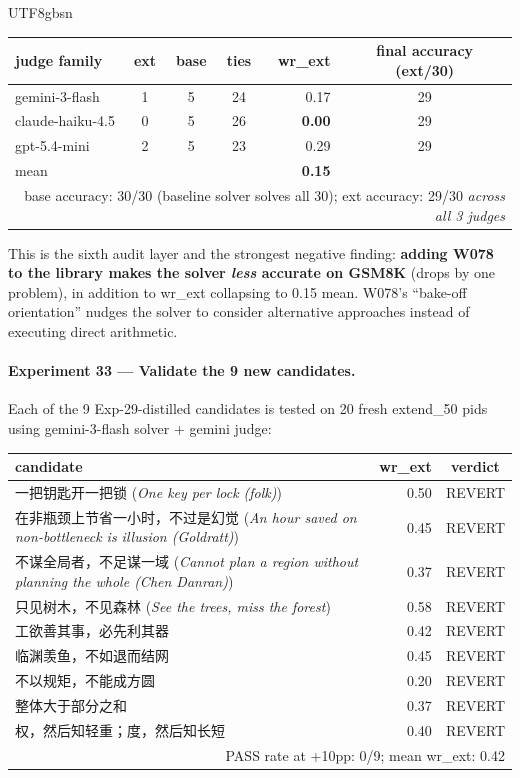 \documentclass{article}
\begin{document}
\begin{CJK*}{UTF8}{gbsn}
\begin{center}\small
\begin{tabular}{l c c c r c}
  \toprule
  judge family & ext & base & ties & wr\_ext & final accuracy (ext/30) \\
  \midrule
  gemini-3-flash       & 1 & 5 & 24 & 0.17 & 29 \\
  claude-haiku-4.5     & 0 & 5 & 26 & \textbf{0.00} & 29 \\
  gpt-5.4-mini         & 2 & 5 & 23 & 0.29 & 29 \\
  \midrule
  mean                 &   &   &    & \textbf{0.15} & \\
  \multicolumn{6}{r}{base accuracy: 30/30 (baseline solver solves
    all 30); ext accuracy: 29/30 \emph{across all 3 judges}} \\
  \bottomrule
\end{tabular}
\end{center}

This is the sixth audit layer and the strongest negative finding:
\textbf{adding W078 to the library makes the solver \emph{less}
accurate on GSM8K} (drops by one problem), in addition to wr\_ext
collapsing to 0.15 mean. W078's ``bake-off orientation'' nudges the
solver to consider alternative approaches instead of executing direct
arithmetic.

\paragraph{Experiment 33 — Validate the 9 new candidates.} Each of
the 9 Exp-29-distilled candidates is tested on 20 fresh extend\_50
pids using gemini-3-flash solver + gemini judge:

\begin{center}\small
\begin{tabular}{l r c}
  \toprule
  candidate & wr\_ext & verdict \\
  \midrule
  一把钥匙开一把锁 (\emph{One key per lock (folk)}) & 0.50 & REVERT \\
  在非瓶颈上节省一小时，不过是幻觉 (\emph{An hour saved on non-bottleneck is illusion (Goldratt)}) & 0.45 & REVERT \\
  不谋全局者，不足谋一域 (\emph{Cannot plan a region without planning the whole (Chen Danran)}) & 0.37 & REVERT \\
  只见树木，不见森林 (\emph{See the trees, miss the forest}) & 0.58 & REVERT \\
  工欲善其事，必先利其器 & 0.42 & REVERT \\
  临渊羡鱼，不如退而结网 & 0.45 & REVERT \\
  不以规矩，不能成方圆 & 0.20 & REVERT \\
  整体大于部分之和 & 0.37 & REVERT \\
  权，然后知轻重；度，然后知长短 & 0.40 & REVERT \\
  \midrule
  \multicolumn{3}{r}{PASS rate at +10pp: 0/9; mean wr\_ext: 0.42} \\
  \bottomrule
\end{tabular}
\end{center}


\end{CJK*}
\end{document}
